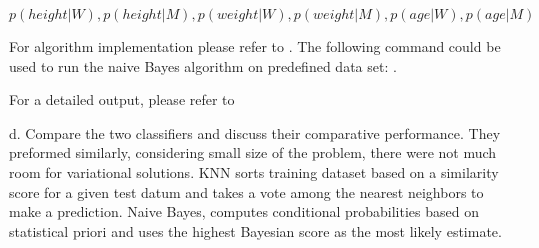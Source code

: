 \documentclass{homeworg}
\begin{document}
$$
p(height|W ), p(height|M ), p(weight|W ),
p(weight|M ), p(age|W ), p(age|M )
$$


For algorithm implementation please refer to \textbf{}.
The following command could be used to run the naive Bayes algorithm on predefined data
set:  \textbf{} \textbf{}.
\newline

For a detailed output, please refer to \textbf{}



d. Compare the two classifiers and discuss their comparative performance.
\newline
They preformed similarly, considering small size of the problem, there were not
much room for variational solutions. KNN sorts training dataset based on a similarity score
for a given test datum and takes a vote among the nearest neighbors to make a prediction.
Naive Bayes, computes conditional probabilities based on statistical priori and
uses the highest Bayesian score as the most likely estimate.
\end{document}
